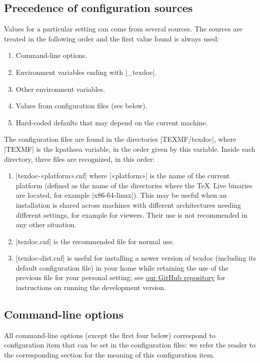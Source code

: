 \documentclass[a4paper, oneside]{scrartcl}
\newcommand\texlive{\TeX~Live\xspace}
\begin{document}
\subsection{Precedence of configuration sources}\label{ss-prec}

Values for a particular setting can come from several sources. The sources are
treated in the following order and the first value found is always used:
\begin{enumerate}
  \item Command-line options.
  \item Environment variables ending with |_texdoc|.
  \item Other environment variables.
  \item Values from configuration files (see below).
  \item Hard-coded defaults that may depend on the current machine.
\end{enumerate}

The configuration files are found in the directories |TEXMF/texdoc|, where
|TEXMF| is the kpathsea variable, in the order given by this variable. Inside
each directory, three files are recognized, in this order:
\begin{enumerate}
  \item |texdoc-«platform».cnf| where |«platform»| is the name of the current
    platform (defined as the name of the directories where the \texlive
    binaries are located, for example |x86-64-linux|). This may be useful when
    an installation is shared across machines with different architectures
    needing different settings, for example for viewers. Their use is not
    recommended in any other situation.
  \item |texdoc.cnf| is the recommended file for normal use.
  \item |texdoc-dist.cnf| is useful for installing a newer version of texdoc
    (including its default configuration file) in your home while retaining
    the use of the previous file for your personal setting; see
    \href{https://github.com/TeX-Live/texdoc}{our GitHub repository} for
    instructions on running the development version.
\end{enumerate}

\subsection{Command-line options}\label{ss-cl}

All command-line options (except the first four below) correspond to
configuration item that can be set in the configuration files: we refer
the reader to the corresponding section for the meaning of this configuration
item.
\end{document}
